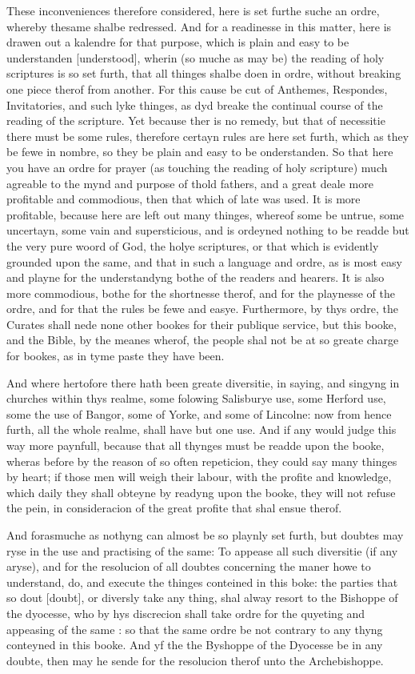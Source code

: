 These inconveniences therefore considered, here is
set furthe suche an ordre, whereby thesame shalbe redressed. And for
a readinesse in this matter, here is drawen out a kalendre for that
purpose, which is plain and easy to be understanden [understood],
wherin (so muche as may be) the reading of holy scriptures is so set
furth, that all thinges shalbe doen in ordre, without breaking one piece
therof from another. For this cause be cut of Anthemes, Respondes, Invitatories,
and such lyke thinges, as dyd breake the continual course of the reading
of the scripture. Yet because ther is no remedy, but that of necessitie
there must be some rules, therefore certayn rules are here set furth,
which as they be fewe in nombre, so they be plain and easy to be onderstanden.
So that here you have an ordre for prayer (as touching the reading of
holy scripture) much agreable to the mynd and purpose of thold fathers,
and a great deale more profitable and commodious, then that which of
late was used. It is more profitable, because here are left out many
thinges, whereof some be untrue, some uncertayn, some vain and supersticious,
and is ordeyned nothing to be readde but the very pure woord of God,
the holye scriptures, or that which is evidently grounded upon the same,
and that in such a language and ordre, as is most easy and playne for
the understandyng bothe of the readers and hearers. It is also more
commodious, bothe for the shortnesse therof, and for the playnesse of
the ordre, and for that the rules be fewe and easye. Furthermore, by
thys ordre, the Curates shall nede none other bookes for their publique
service, but this booke, and the Bible, by the meanes wherof, the people
shal not be at so greate charge for bookes, as in tyme paste they have
been.

And where hertofore there hath been greate diversitie,
in saying, and singyng in churches within thys realme, some folowing
Salisburye use, some Herford use, some the use of Bangor, some of Yorke,
and some of Lincolne: now from hence furth, all the whole realme, shall
have but one use. And if any would judge this way more paynfull, because
that all thynges must be readde upon the booke, wheras before by the
reason of so often repeticion, they could say many thinges by heart;
if those men will weigh their labour, with the profite and knowledge,
which daily they shall obteyne by readyng upon the booke, they will
not refuse the pein, in consideracion of the great profite that shal
ensue therof.

And forasmuche as nothyng can almost be so playnly
set furth, but doubtes may ryse in the use and practising of the same:
To appease all such diversitie (if any aryse), and for the resolucion
of all doubtes concerning the maner howe to understand, do, and execute
the thinges conteined in this boke: the parties that so dout [doubt],
or diversly take any thing, shal alway resort to the Bishoppe of the
dyocesse, who by hys discrecion shall take ordre for the quyeting and
appeasing of the same : so that the same ordre be not contrary to any
thyng conteyned in this booke. And yf the the Byshoppe of the Dyocesse
be in any doubte, then may he sende for the resolucion therof unto the
Archebishoppe.

